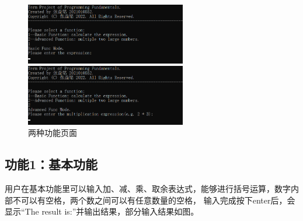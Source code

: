 \documentclass[a4paper, 11pt, UTF8]{ctexart}
\begin{document}
\begin{figure}[H]
    \centering
    \begin{minipage}[t]{0.48\textwidth}
        \centering
        \includegraphics[width=7cm]{func1.png}
    \end{minipage}
    \begin{minipage}[t]{0.48\textwidth}
        \centering
        \includegraphics[width=7cm]{func2.png}
    \end{minipage}
    \caption{两种功能页面}
\end{figure}

\subsection{功能1：基本功能}

用户在基本功能里可以输入加、减、乘、取余表达式，能够进行括号运算，数字内部不可以有空格，两个数之间可以有任意数量的空格，
输入完成按下enter后，会显示“The result is:”并输出结果，部分输入结果如图。
\end{document}
